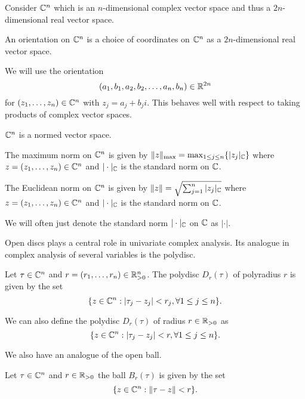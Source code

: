 Consider $\mathbb{C}^{n}$ which is an $n$-dimensional complex vector space and thus a $2n$-dimensional real vector space. 
\begin{definition}[Orientation]\label{def: orientation}
    An orientation on $\mathbb{C}^{n}$ is a choice of coordinates on $\mathbb{C}^{n}$ as a $2n$-dimensional real vector space. 
\end{definition}
\begin{remark}\label{rmk: choice of orientations}
    We will use the orientation 
    $$(a_{1},b_{1},a_{2},b_{2},\dots,a_{n},b_{n})\in\mathbb{R}^{2n}$$ 
    for $(z_{1},\dots,z_{n})\in\mathbb{C}^{n}$ with $z_{j}=a_{j}+b_{j}i$. This behaves well with respect to taking products of complex vector spaces. 
\end{remark}
$\mathbb{C}^{n}$ is a normed vector space. 
\begin{definition}\label{def: maximum norm}
    The maximum norm on $\mathbb{C}^{n}$ is given by $\Vert z\Vert_{\max}=\max_{1\leq j\leq n}\{|z_{j}|_{\mathbb{C}}\}$ where $z=(z_{1},\dots,z_{n})\in\mathbb{C}^{n}$ and $|\cdot|_{\mathbb{C}}$ is the standard norm on $\mathbb{C}$. 
\end{definition}
\begin{definition}\label{def: Euclidean norm}
    The Euclidean norm on $\mathbb{C}^{n}$ is given by $\Vert z\Vert=\sqrt{\sum_{j=1}^{n}|z_{j}|_{\mathbb{C}}}$ where $z=(z_{1},\dots,z_{n})\in\mathbb{C}^{n}$ and $|\cdot|_{\mathbb{C}}$ is the standard norm on $\mathbb{C}$. 
\end{definition}
\begin{remark}
    We will often just denote the standard norm $|\cdot|_{\mathbb{C}}$ on $\mathbb{C}$ as $|\cdot|$. 
\end{remark}
Open discs plays a central role in univariate complex analysis. Its analogue in complex analysis of several variables is the polydisc. 
\begin{definition}[Polydisc]\label{def: polydisc}
    Let $\tau\in\mathbb{C}^{n}$ and $r=(r_{1},\dots,r_{n})\in\mathbb{R}_{>0}^{n}$. The polydisc $D_{r}(\tau)$ of polyradius $r$ is given by the set 
    $$\{z\in\mathbb{C}^{n}:|\tau_{j}-z_{j}|<r_{j}, \forall 1\leq j\leq n\}.$$
\end{definition}
\begin{remark}
    We can also define the polydisc $D_{r}(\tau)$ of radius $r\in\mathbb{R}_{>0}$ as 
    $$\{z\in\mathbb{C}^{n}:|\tau_{j}-z_{j}|<r, \forall 1\leq j\leq n\}.$$
\end{remark}
We also have an analogue of the open ball. 
\begin{definition}\label{def: multivariate open ball}
    Let $\tau\in\mathbb{C}^{n}$ and $r\in\mathbb{R}_{>0}$ the ball $B_{r}(\tau)$ is given by the set 
    $$\{z\in\mathbb{C}^{n}:\Vert \tau-z\Vert < r\}.$$
\end{definition}
